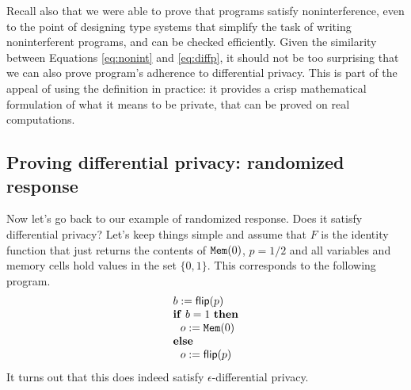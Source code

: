 \documentclass[11pt,twoside]{scrartcl}
\begin{document}
Recall also that we were able to prove that programs satisfy noninterference, even to the point of designing type systems that simplify the task of writing noninterferent programs, and can be checked efficiently. Given the similarity between Equations \ref{eq:nonint} and \ref{eq:diffp}, it should not be too surprising that we can also prove program's adherence to differential privacy. This is part of the appeal of using the definition in practice: it provides a crisp mathematical formulation of what it means to be private, that can be proved on real computations.

\subsection{Proving differential privacy: randomized response}

Now let's go back to our example of randomized response. Does it satisfy differential privacy? Let's keep things simple and assume that $F$ is the identity function that just returns the contents of $\texttt{\upshape Mem}(0)$, $p = 1/2$ and all variables and memory cells hold values in the set $\{0,1\}$. This corresponds to the following program.
\begin{equation}
\begin{array}{l}
%
b := \flip(p) \\
\mathbf{if}\ b = 1\ \mathbf{then} \\
\ \ o := \pderef{0} \\
\mathbf{else} \\
\ \ o := \flip(p)
\end{array}
\end{equation}
It turns out that this does indeed satisfy $\epsilon$-differential privacy.
\end{document}
